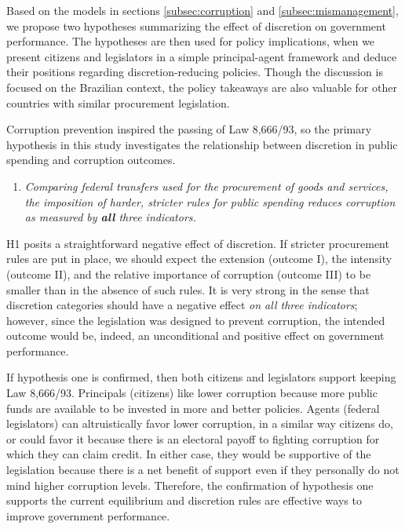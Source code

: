 \documentclass[11pt]{article}
\newcommand{\hypopen}{Comparing federal transfers used for the procurement of goods and services}
\begin{document}
Based on the models in sections \ref{subsec:corruption} and \ref{subsec:mismanagement}, we propose two hypotheses summarizing the effect of discretion on government performance. The hypotheses are then used for policy implications, when we present citizens and legislators in a simple principal-agent framework and deduce their positions regarding discretion-reducing policies. Though the discussion is focused on the Brazilian context, the policy takeaways are also valuable for other countries with similar procurement legislation.

Corruption prevention inspired the passing of Law 8,666/93, so the primary hypothesis in this study investigates the relationship between discretion in public spending and corruption outcomes.

\begin{enumerate}[label = H\arabic{enumi}:, font = \bfseries, labelindent = \parindent, leftmargin = *, resume] %
  \item \textit{\hypopen, the imposition of harder, stricter rules for public spending reduces corruption as measured by \textbf{all} three indicators.}
\end{enumerate}

H1 posits a straightforward negative effect of discretion. If stricter procurement rules are put in place, we should expect the extension (outcome I), the intensity (outcome II), and the relative importance of corruption (outcome III) to be smaller than in the absence of such rules. It is very strong in the sense that discretion categories should have a negative effect \emph{on all three indicators}; however, since the legislation was designed to prevent corruption, the intended outcome would be, indeed, an unconditional and positive effect on government performance.

If hypothesis one is confirmed, then both citizens and legislators support keeping Law 8,666/93. Principals (citizens) like lower corruption because more public funds are available to be invested in more and better policies. Agents (federal legislators) can altruistically favor lower corruption, in a similar way citizens do, or could favor it because there is an electoral payoff to fighting corruption for which they can claim credit. In either case, they would be supportive of the legislation because there is a net benefit of support even if they personally do not mind higher corruption levels. Therefore, the confirmation of hypothesis one supports the current equilibrium and discretion rules are effective ways to improve government performance.
\end{document}

